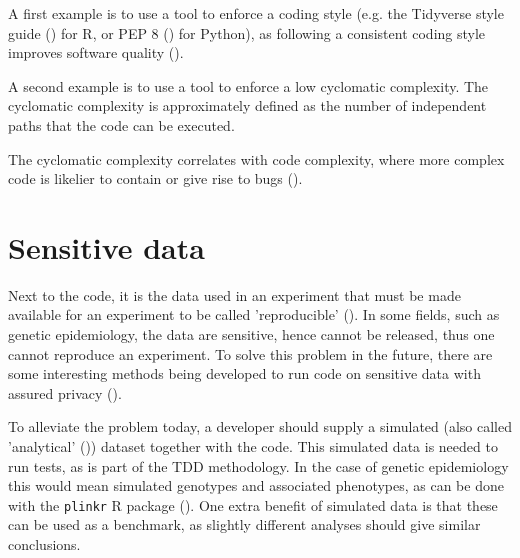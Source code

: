 
A first example is to use a tool to enforce a coding style 
(e.g. the Tidyverse style guide (\cite{wickham2019advanced}) for R,
or PEP 8 (\cite{van2001pep}) for Python),
as following a consistent coding style improves software quality (\cite{fang2001}).


A second example is to use a tool to enforce a low cyclomatic complexity.
The cyclomatic complexity is approximately defined 
as the number of independent paths that
the code can be executed. 

The cyclomatic complexity correlates with code complexity,
where more complex code is likelier to contain or give rise to bugs 
(\cite{abd2018calculating,chen2019empirical,zimmermann2008predicting}).

\section{Sensitive data}\label{sec:sensitive-data}

Next to the code, it is the data used in an experiment 
that must be made available for an experiment 
to be called 'reproducible' (\cite{peng2006reproducible}).
In some fields, such as genetic epidemiology, the data are
sensitive, hence cannot be released, thus one cannot reproduce 
an experiment.
To solve this problem in the future, there are some 
interesting methods being developed to run code on sensitive
data with assured privacy (\cite{zhang2016review,azencott2018machine}).

To alleviate the problem today,
a developer should supply a simulated 
(also called 'analytical' (\cite{peng2006reproducible})) dataset
together with the code.
This simulated data is needed to run tests, as is 
part of the TDD methodology.
In the case of genetic epidemiology this would mean
simulated genotypes and associated phenotypes,
as can be done with the \verb|plinkr| R package (\cite{plinkr}).
One extra benefit of simulated data is that these can be used
as a benchmark, as slightly different analyses should give 
similar conclusions.


